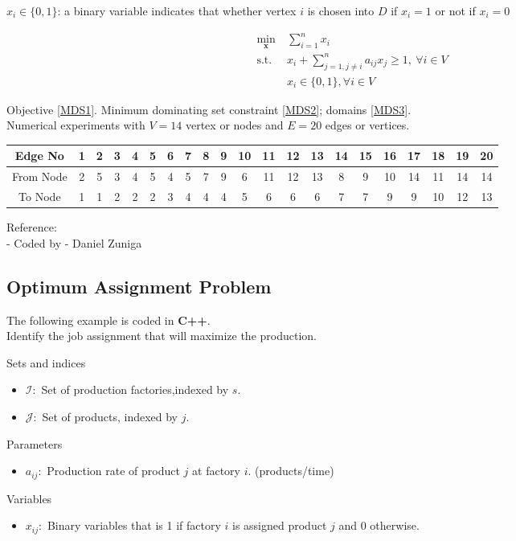 \documentclass[10pt,bezier]{article}
\begin{document}
$x_i \in \{0,1\}$: a binary variable indicates that whether vertex $i$ is chosen into $D$ if $x_i=1$ or not if $x_i=0$

\begin{subequations}\label{MDS}
    \begin{align}
    \min_{\pmb{x}} ~& \sum_{i =1}^n x_i \label{MDS1}\\
    \text{s.t. } & x_i + \sum_{j = 1, j \neq i}^n a_{ij} x_j \geq 1,~ \forall i \in V \label{MDS2}\\
                 & x_i \in \{0,1\}, \forall i \in V \label{MDS3}
    \end{align}
\end{subequations}

Objective \eqref{MDS1}. Minimum dominating set constraint \eqref{MDS2}; domains \eqref{MDS3}.\\

Numerical experiments with $V = 14$ vertex or nodes and $E = 20$ edges or vertices.
\begin{table}[!htbp]
    \centering
    \begin{tabular}{c | c c c c c c c c c c c c c c c c c c c c}
        Edge No   & 1 & 2 & 3 & 4 & 5 & 6 & 7 & 8 & 9 & 10 & 11& 12& 13& 14 & 15 & 16& 17& 18 & 19 & 20\\ \hline
        From Node & 2 & 5 & 3 & 4 & 5 & 4 & 5 & 7 & 9 & 6 & 11& 12& 13& 8 & 9 & 10& 14& 11 & 14 & 14\\
        To Node   & 1 & 1 & 2 & 2 & 2 & 3 & 4 & 4 & 4 & 5 & 6 & 6 & 6 & 7 & 7 & 9 & 9 & 10 & 12 & 13
    \end{tabular}
\end{table}

\noindent Reference:\\
- Coded by - Daniel Zuniga

\newpage
\subsection{Optimum Assignment Problem}\label{Section7.7}
The following example is coded in {\color{blue}\textbf{C++}}.\\

Identify the job assignment that will maximize the production.

\noindent Sets and indices
\begin{itemize}
  \item $\mathcal{I}$:~Set of production factories,indexed by $s$.
  \item $\mathcal{J}$:~Set of products, indexed by $j$.
\end{itemize}
Parameters
\begin{itemize}
    \item $a_{ij}$:~Production rate of product $j$ at factory $i$. (products/time)
\end{itemize}
Variables
\begin{itemize}
  \item $x_{ij}$:~Binary variables that is 1 if factory $i$ is assigned product $j$ and 0 otherwise.
\end{itemize}
\end{document}
